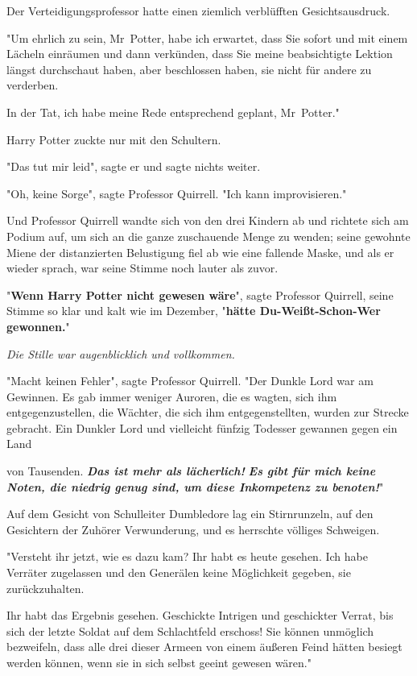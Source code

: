 {Der Verteidigungsprofessor hatte einen ziemlich verblüfften Gesichtsausdruck.

"Um ehrlich zu sein, Mr~Potter, habe ich erwartet, dass Sie sofort und mit einem Lächeln einräumen und dann verkünden, dass Sie meine beabsichtigte Lektion längst durchschaut haben, aber beschlossen haben, sie nicht für andere zu verderben.

In der Tat, ich habe meine Rede entsprechend geplant, Mr~Potter."

Harry Potter zuckte nur mit den Schultern.

"Das tut mir leid", sagte er und sagte nichts weiter.

"Oh, keine Sorge", sagte Professor Quirrell. "Ich kann improvisieren."

Und Professor Quirrell wandte sich von den drei Kindern ab und richtete sich am Podium auf, um sich an die ganze zuschauende Menge zu wenden; seine gewohnte Miene der distanzierten Belustigung fiel ab wie eine fallende Maske, und als er wieder sprach, war seine Stimme noch lauter als zuvor.

"\textbf{Wenn Harry Potter nicht gewesen wäre}", sagte Professor Quirrell, seine Stimme so klar und kalt wie im Dezember, "\textbf{hätte Du-Weißt-Schon-Wer gewonnen.}"

\emph{Die Stille war augenblicklich und vollkommen.}

"Macht keinen Fehler", sagte Professor Quirrell. "Der Dunkle Lord war am Gewinnen. Es gab immer weniger Auroren, die es wagten, sich ihm entgegenzustellen, die Wächter, die sich ihm entgegenstellten, wurden zur Strecke gebracht. Ein Dunkler Lord und vielleicht fünfzig Todesser gewannen gegen ein Land

von Tausenden. \textbf{\emph{Das ist mehr als lächerlich!}} \textbf{\emph{Es gibt für mich keine Noten, die niedrig genug sind, um diese Inkompetenz zu benoten!}}"

Auf dem Gesicht von Schulleiter Dumbledore lag ein Stirnrunzeln, auf den Gesichtern der Zuhörer Verwunderung, und es herrschte völliges Schweigen.

"Versteht ihr jetzt, wie es dazu kam? Ihr habt es heute gesehen. Ich habe Verräter zugelassen und den Generälen keine Möglichkeit gegeben, sie zurückzuhalten.

Ihr habt das Ergebnis gesehen. Geschickte Intrigen und geschickter Verrat, bis sich der letzte Soldat auf dem Schlachtfeld erschoss! Sie können unmöglich bezweifeln, dass alle drei dieser Armeen von einem äußeren Feind hätten besiegt werden können, wenn sie in sich selbst geeint gewesen wären."

}
